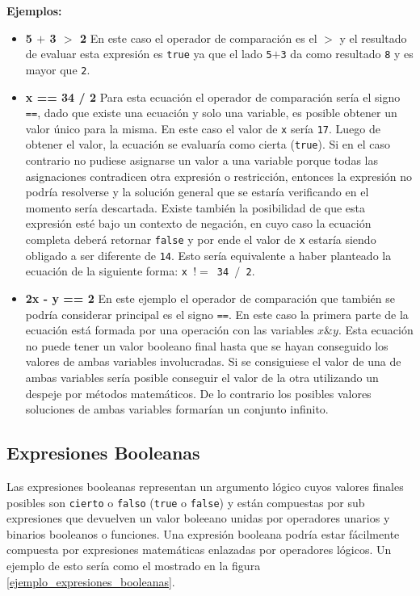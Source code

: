 \textbf{Ejemplos:}
\begin{itemize}
 \item{\textbf{5 $+$ 3 $>$ 2} En este caso el operador de comparación es el \texttt{$>$} y 
  el resultado de evaluar esta expresión es \texttt{true} ya que el lado \texttt{5$+$3} da como
  resultado \texttt{8} y es mayor que \texttt{2}.}

 \item{\textbf{x == 34 / 2} Para esta ecuación el operador de comparación sería 
  el signo \texttt{==}, dado que existe una ecuación y solo una variable, es posible 
  obtener un valor único para la misma. En este caso el valor de \texttt{x} sería \texttt{17}. 
  Luego de obtener el valor, la ecuación se evaluaría como cierta (\texttt{true}). Si 
  en el caso contrario no pudiese asignarse un valor a una variable porque todas 
  las asignaciones contradicen otra expresión o restricción, entonces la 
  expresión no podría resolverse y la solución general que se estaría verificando
  en el momento sería descartada. Existe también la posibilidad de que esta 
  expresión esté bajo un contexto de negación, en cuyo caso la ecuación completa
  deberá retornar \texttt{false} y por ende el valor de \texttt{x} estaría siendo obligado a 
  ser diferente de \texttt{14}. Esto sería equivalente a haber planteado la ecuación de 
  la siguiente forma: \texttt{x $!=$ 34 $/$ 2}.}	

 \item{\textbf{2x - y == 2} En este ejemplo el operador de comparación que también 
  se podría considerar principal es el signo \texttt{==}. En este caso la primera parte 
  de la ecuación está formada por una operación con las variables \texttt{$x \& y$}. 
  Esta ecuación no puede tener un valor booleano final hasta que se hayan 
  conseguido los valores de ambas variables involucradas. Si se consiguiese el 
  valor de una de ambas variables sería posible conseguir el valor de la otra 
  utilizando un despeje por métodos matemáticos. De lo contrario los posibles 
  valores soluciones de ambas variables formarían un conjunto infinito.}
\end{itemize}

\subsection{Expresiones Booleanas}
Las expresiones booleanas representan un argumento lógico cuyos valores finales 
posibles son \texttt{cierto} o \texttt{falso} (\texttt{true} o \texttt{false}) y están compuestas por sub expresiones que
devuelven un valor boleeano unidas por operadores unarios y binarios booleanos o 
funciones. Una expresión booleana podría estar fácilmente compuesta por expresiones 
matemáticas enlazadas por operadores lógicos. Un ejemplo de esto sería como el 
mostrado en la figura \ref{ejemplo_expresiones_booleanas}.

